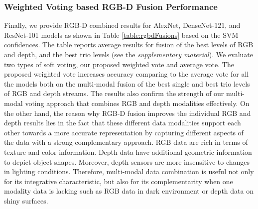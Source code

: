 \subsubsection{Weighted Voting based RGB-D Fusion Performance} \label{sec.exp.ma.weightedFusion}
Finally, we provide RGB-D combined results for AlexNet, DenseNet-121, and ResNet-101 models as shown in Table \ref{table:rgbdFusions} based on the SVM confidences. The table reports average results for fusion of the best levels of RGB and depth, and the best trio levels (see the \textit{supplementary material}). We evaluate two types of soft voting, our proposed weighted vote and average vote. The proposed weighted vote increases accuracy comparing to the average vote for all the models both on the multi-modal fusion of the best single and best trio levels of RGB and depth streams. The results also confirm the strength of our multi-modal voting approach that combines RGB and depth modalities effectively. On the other hand, the reason why RGB-D fusion improves the individual RGB and depth results lies in the fact that these different data modalities support each other towards a more accurate representation by capturing different aspects of the data with a strong complementary approach. RGB data are rich in terms of texture and color information. Depth data have additional geometric information to depict object shapes. Moreover, depth sensors are more insensitive to changes in lighting conditions. Therefore, multi-modal data combination is useful not only for its integrative characteristic, but also for its complementarity when one modality data is lacking such as RGB data in dark environment or depth data on shiny surfaces.

